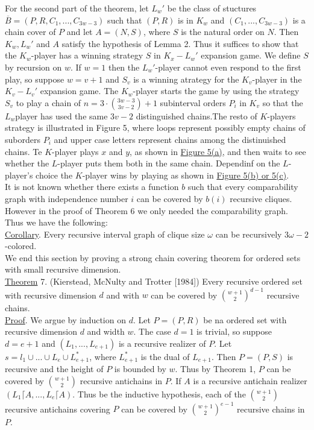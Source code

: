 \documentclass[twoside]{article}
\begin{document}
For the second part of the theorem, let $L_w'$ be the class of stuctures
$\overline{B} = (P,R,C_1,...,C_{3w-3})$ such that $(P,R)$ is in $K_w$ and 
$(C_1,...,C_{3w-3})$ is a chain cover of $P$ and let $A=(N,S)$, where $S$ 
is the natural order on $N$. Then $K_w,L_w'$ and $A$ satisfy the
hypothesis of Lemma 2. Thus it suffices to show that the $K_w$-player has
a winning strategy $S$ in $K_x-L_w'$ expansion game.
%
%
We define $S$ by recursion on $w$. If $w=1$ then the $L_w'$-player cannot
even respond to the first play, so suppose $w=v+1$ and $S_v$ is a winning atrategy
for the $K_v$-player in the $K_v-L_v'$ expansion game. The $K_w$-player starts
the game by using the strategy $S_v$ to play a chain of 
$n = 3 \cdot {{3w-3} \choose {3v-2}} +1$ subinterval orders $P_i$ in $K_v$ so that
the $L_w$player has used the same $3v-2$ distinguished chains.The resto of $K$-players
strategy is illustrated in  Figure 5, where loops represent possibly empty chains of
suborders $P_i$ and upper case letters represent chains among the distinuished chains.
Te $K$-player plays $x$ and $y$, as shown in \underline{Figure 5(a)}, and then waits
to see whether the $L$-player puts them both in the same chain. Dependinf on the 
$L$-player's choice the $K$-player wins by playing as shown in
\underline{Figure 5(b) or 5(c)}.\\

It is not known whether there exists a function $b$ such that every comparability
graph with independence number $i$ can be covered by $b(i)$ recursive cliques.
However in the proof of Theorem 6 we only needed the comparability graph.
Thus we have the following:\\
\newline
\underline{Corollary}. Every recursive interval graph of clique size $\omega$ can
be recursively $3\omega -2$-colored.\\
\newline
We end this section by proving a strong chain covering theorem for ordered sets with small 
recursive dimension.\\
\newline
\underline{Theorem} 7. (Kierstead, McNulty and Trotter [1984]) Every recursive
ordered set with recursive dimension $d$ and with $w$ can be covered by 
${{w+1} \choose 2}^{d-1}$ recursive chains.\\
\newline
\underline{Proof}. We argue by induction on $d$. Let $P = (P,R)$ be na ordered set 
with recursive dimension $d$ and width $w$. The case $d=1$ is trivial, so suppose
$d=e+1$ and $(L_1,...,L_{e+1})$ is a recursive realizer of $P$. Let
$s=l_1 \cup ... \cup L_e\cup L_{e+1}^*$, where $L_{e+1}^*$ is the dual of $L_{e+1}$.
Then $P=(P,S)$ is recursive and the height of $P$ is bounded by $w$. Thus by Theorem 1, $P$
can be covered by ${w+1} \choose 2$ recursive antichains in $P$. If $A$ is a recursive antichain
realizer $(L_1 \lceil A,...,L_e \lceil A)$. Thus be the inductive hypothesis, each of the 
${w+1 \choose 2}$ recursive antichains covering $P$ can be covered by ${{w+1} \choose 2}^{e-1}$
recursive chains in $P$.\\
\end{document}
